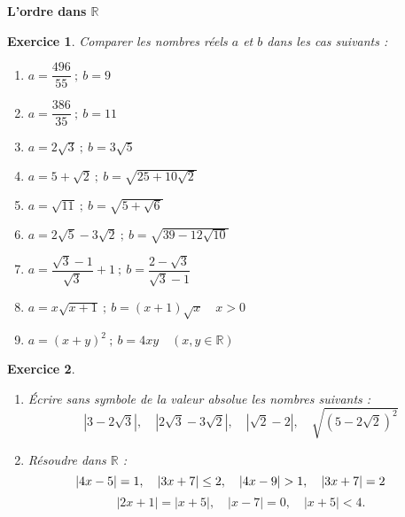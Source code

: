 \documentclass[12pt,a4paper]{article}
\theoremstyle{mystyle}
\newtheorem{exo}{Exercice}
\begin{document}
\pagestyle{fancy}
\fancyhf{} %
\fancyfoot[C]{\thepage} %


\begin{center}
    \textbf{\Large L'ordre dans $\mathbb{R}$ }
\end{center}
\begin{multicols*}{2}
\begin{exo}
Comparer les nombres réels $a$ et $b$ dans les cas suivants :
\begin{enumerate}
	\item $a = \dfrac{496}{55} \ ; \ b = 9$
	\item $a = \dfrac{386}{35} \ ; \ b = 11$
	\item $a = 2\sqrt{3} \ ; \ b = 3\sqrt{5}$
    \item $a = 5 + \sqrt{2} \ ; \ b = \sqrt{25 + 10 \sqrt{2}}$
    \item $a = \sqrt{11} \ ; \ b = \sqrt{5 + \sqrt{6}}$
    \item $a = 2\sqrt{5} - 3\sqrt{2} \ ; \ b = \sqrt{39 - 12\sqrt{10}}$
    \item $a = \dfrac{\sqrt{3} -1}{\sqrt{3}} + 1 \ ; \ b = \dfrac{2-\sqrt{3}}{\sqrt{3} - 1}$
	\item $a = x\sqrt{x+1} \ ; \ b = (x+1)\sqrt{x}\quad x>0$  
    \item $a = (x + y)^2 \ ; \ b = 4xy \quad (x, y \in \mathbb{R})$
\end{enumerate}
\end{exo}

\begin{exo}
\text{ }
\begin{enumerate}
    \item Écrire sans symbole de la valeur absolue les nombres suivants :  
    $$|3 - 2\sqrt{3}|, \quad |2\sqrt{3} - 3\sqrt{2}|, \quad | \sqrt{2} - 2|, \quad \sqrt{(5 - 2\sqrt{2})^2}$$
    

    \item Résoudre dans \(\mathbb{R}\) :
    $$
    \hspace{-0.6cm}|4x - 5| = 1, \quad |3x + 7| \leq 2, \quad |4x - 9| > 1, \quad |3x + 7| = 2
    $$
  	$$
    |2x+1| = |x+5|, \quad |x-7| = 0, \quad |x+5| < 4.
    $$
\end{enumerate}


\end{exo}
\end{multicols*}
\end{document}
